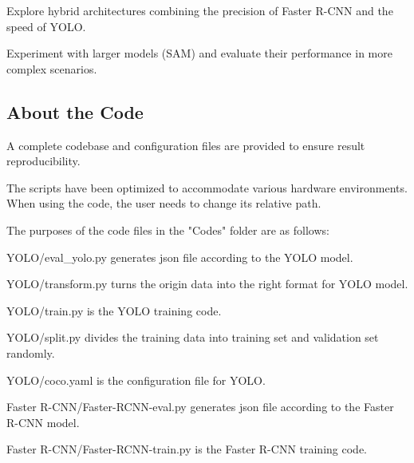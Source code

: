 Explore hybrid architectures combining the precision of Faster R-CNN and the speed of YOLO.

Experiment with larger models (\eg SAM) and evaluate their performance in more complex scenarios.

\subsection{About the Code}

A complete codebase and configuration files are provided to ensure result reproducibility.

The scripts have been optimized to accommodate various hardware environments. When using the code, the user needs to change its relative path.

The purposes of the code files in the "Codes" folder are as follows:

YOLO/eval\_yolo.py generates json file according to the YOLO model.

YOLO/transform.py turns the origin data into the right format for YOLO model.

YOLO/train.py is the YOLO training code.

YOLO/split.py divides the training data into training set and validation set randomly.

YOLO/coco.yaml is the configuration file for YOLO.

Faster R-CNN/Faster-RCNN-eval.py generates json file according to the Faster R-CNN model.

Faster R-CNN/Faster-RCNN-train.py is the Faster R-CNN training code.
